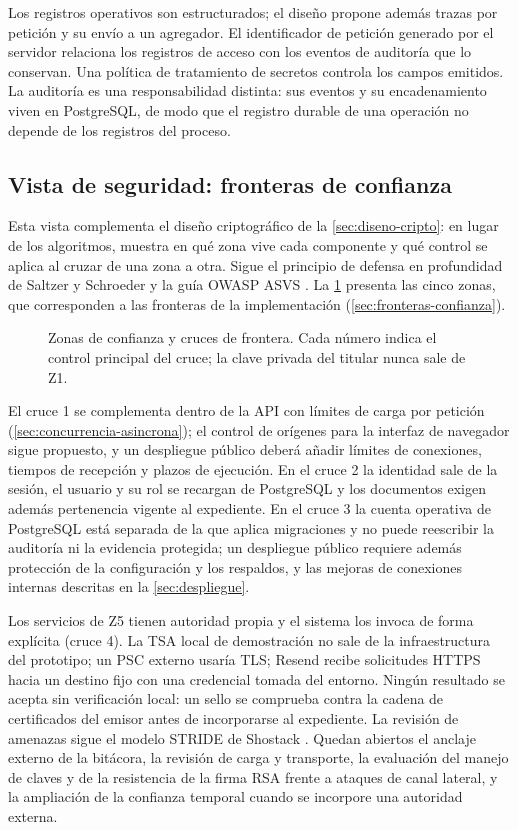 Los registros operativos son estructurados; el diseño propone además trazas por petición y su envío a un agregador. El identificador de petición generado por el servidor relaciona los registros de acceso con los eventos de auditoría que lo conservan. Una política de tratamiento de secretos controla los campos emitidos. La auditoría es una responsabilidad distinta: sus eventos y su encadenamiento viven en PostgreSQL, de modo que el registro durable de una operación no depende de los registros del proceso.

\subsection{Vista de seguridad: fronteras de confianza}\label{sec:vista-seguridad}

Esta vista complementa el diseño criptográfico de la \cref{sec:diseno-cripto}: en lugar de los algoritmos, muestra en qué zona vive cada componente y qué control se aplica al cruzar de una zona a otra. Sigue el principio de defensa en profundidad de Saltzer y Schroeder \cite{saltzer1975} y la guía OWASP ASVS \cite{owasp2021}. La \cref{fig:zonas-confianza} presenta las cinco zonas, que corresponden a las fronteras de la implementación (\cref{sec:fronteras-confianza}).

\begin{figure}[H]
  \centering
  
  \caption{Zonas de confianza y cruces de frontera. Cada número indica el control principal del cruce; la clave privada del titular nunca sale de Z1.}
  \label{fig:zonas-confianza}
\end{figure}

El cruce 1 se complementa dentro de la API con límites de carga por petición (\cref{sec:concurrencia-asincrona}); el control de orígenes para la interfaz de navegador sigue propuesto, y un despliegue público deberá añadir límites de conexiones, tiempos de recepción y plazos de ejecución. En el cruce 2 la identidad sale de la sesión, el usuario y su rol se recargan de PostgreSQL y los documentos exigen además pertenencia vigente al expediente. En el cruce 3 la cuenta operativa de PostgreSQL está separada de la que aplica migraciones y no puede reescribir la auditoría ni la evidencia protegida; un despliegue público requiere además protección de la configuración y los respaldos, y las mejoras de conexiones internas descritas en la \cref{sec:despliegue}.

Los servicios de Z5 tienen autoridad propia y el sistema los invoca de forma explícita (cruce 4). La TSA local de demostración no sale de la infraestructura del prototipo; un PSC externo usaría TLS; Resend recibe solicitudes HTTPS hacia un destino fijo con una credencial tomada del entorno. Ningún resultado se acepta sin verificación local: un sello se comprueba contra la cadena de certificados del emisor antes de incorporarse al expediente. La revisión de amenazas sigue el modelo STRIDE de Shostack \cite{shostack2014}. Quedan abiertos el anclaje externo de la bitácora, la revisión de carga y transporte, la evaluación del manejo de claves y de la resistencia de la firma RSA frente a ataques de canal lateral, y la ampliación de la confianza temporal cuando se incorpore una autoridad externa.

